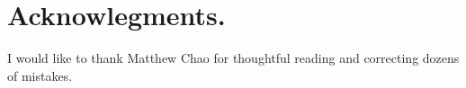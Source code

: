 \section*{Acknowlegments.}
I would like to thank  
Matthew Chao for thoughtful reading 
and correcting dozens of mistakes.






